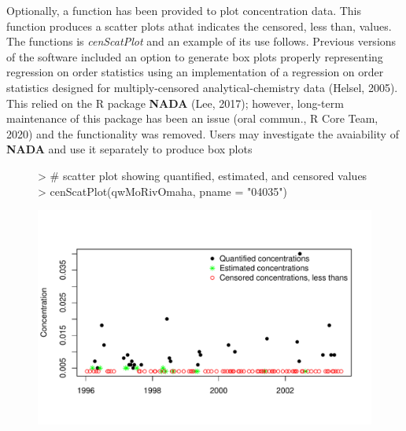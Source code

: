 \documentclass[11pt]{article}
\begin{document}
Optionally, a function has been provided to plot concentration data.  This function produces a scatter plots athat indicates the censored, less than, values.  The functions is \textit{cenScatPlot} and an example of its use follows.  Previous versions of the software included an option to generate box plots properly representing regression on order statistics using an implementation of a regression on order statistics designed for multiply-censored analytical-chemistry data (Helsel, 2005). This relied on the R package \textbf{NADA} (Lee, 2017); however, long-term maintenance of this package has been an issue (oral commun., R Core Team, 2020) and the functionality was removed. Users may investigate the avaiability of \textbf{NADA} and use it separately to produce box plots
\vspace{5 mm}

\begin{figure}[H]
\centering
\begin{Schunk}
\begin{Sinput}
> # scatter plot showing quantified, estimated, and censored  values
> cenScatPlot(qwMoRivOmaha, pname = "04035")
\end{Sinput}
\end{Schunk}
\includegraphics{vignette-002}
\end{figure}
\end{document}
